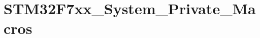 \hypertarget{group__STM32F7xx__System__Private__Macros}{}\section{S\+T\+M32\+F7xx\+\_\+\+System\+\_\+\+Private\+\_\+\+Macros}
\label{group__STM32F7xx__System__Private__Macros}
